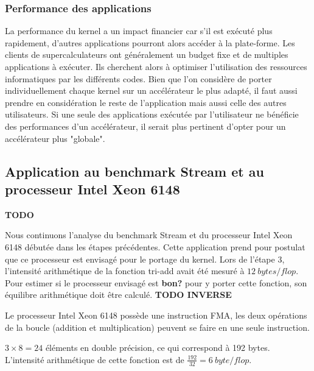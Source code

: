\subsubsection{Performance des applications }
La performance du kernel a un impact financier car s'il est exécuté plus rapidement, d'autres applications pourront alors accéder à la plate-forme. Les clients de supercalculateurs ont généralement un budget fixe et de multiples applications à exécuter. Ils cherchent alors à optimiser l'utilisation des ressources informatiques par les différents codes. Bien que l'on considère de porter individuellement chaque kernel sur un accélérateur le plus adapté, il faut aussi prendre en considération le reste de l'application mais aussi celle des autres utilisateurs. Si une seule des applications exécutée par l'utilisateur ne bénéficie des performances d'un accélérateur, il serait plus pertinent d'opter pour un accélérateur plus "globale". 


\subsection{Application au benchmark Stream et au processeur Intel Xeon 6148}
 \textbf{TODO}

Nous continuons l'analyse du benchmark Stream et du processeur Intel Xeon 6148 débutée dans les étapes précédentes. Cette application prend pour postulat que ce processeur est envisagé pour le portage du kernel.
Lors de l'étape 3, l'intensité arithmétique de la fonction tri-add avait été mesuré à $12\ bytes/flop$. Pour estimer si le processeur envisagé est \textbf{bon?} pour y porter cette fonction, son équilibre arithmétique doit être calculé. \textbf{TODO INVERSE}

Le processeur Intel Xeon 6148 possède une instruction FMA, les deux opérations de la boucle (addition et multiplication) peuvent se faire en une seule instruction.

$3 \times 8 = 24$ éléments en double précision, ce qui correspond à 192 bytes. L'intensité arithmétique de cette fonction est de $ \frac{192}{32} = 6\ byte/flop$. 

